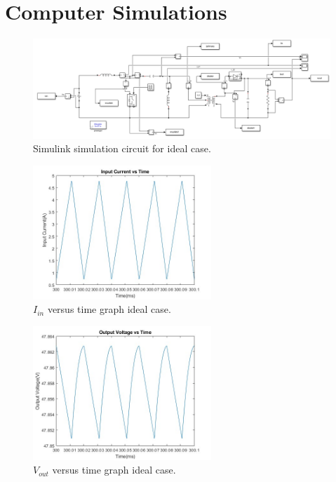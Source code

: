 \section{Computer Simulations}  \label{comp_simulation}
\begin{figure}[H]
    \centering
    \includegraphics[width=\textwidth]{Figures/mat_cirr.png}
    \caption{Simulink simulation circuit for ideal case.}
    \label{fig:simulink}
\end{figure}
\begin{figure}[H]
    \centering
    \includegraphics[width=0.6\textwidth]{Figures/mat_iin.jpg}
    \caption{$I_{in}$ versus time graph ideal case.}
    \label{fig:mat_i_in}
\end{figure}
\begin{figure}[H]
    \centering
    \includegraphics[width=0.6\textwidth]{Figures/mat_vout.jpg}
    \caption{$V_{out}$ versus time graph ideal case.}
    \label{fig:mat_v_out}
\end{figure}
